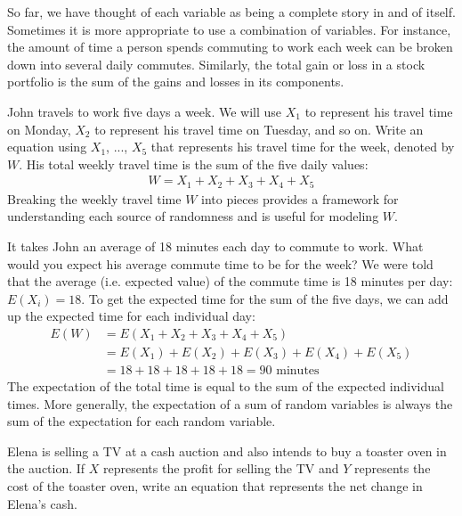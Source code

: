 So far, we have thought of each variable as being a complete story in and of itself. Sometimes it is more appropriate to use a combination of variables. For instance, the amount of time a person spends commuting to work each week can be broken down into several daily commutes. Similarly, the total gain or loss in a stock portfolio is the sum of the gains and losses in its components.

\begin{examplewrap}
\begin{nexample}{John travels to work five days a week. We will use $X_1$ to represent his travel time on Monday, $X_2$ to represent his travel time on Tuesday, and so on. Write an equation using $X_1$, ..., $X_5$ that represents his travel time for the week, denoted by $W$.}
His total weekly travel time is the sum of the five daily values:
\begin{align*}
W = X_1 + X_2 + X_3 + X_4 + X_5
\end{align*}
Breaking the weekly travel time $W$ into pieces provides a framework for understanding each source of randomness and is useful for modeling $W$.
\end{nexample}
\end{examplewrap}

\begin{examplewrap}
\begin{nexample}{It takes John an average of 18 minutes each day to commute to work. What would you expect his average commute time to be for the week?}
We were told that the average (i.e. expected value) of the commute time is 18 minutes per day: $E(X_i) = 18$. To get the expected time for the sum of the five days, we can add up the expected time for each individual day:
\begin{align*}
E(W) &= E(X_1 + X_2 + X_3 + X_4 + X_5) \\
	&= E(X_1) + E(X_2) + E(X_3) + E(X_4) + E(X_5) \\
	&= 18 + 18 + 18 + 18 + 18 = 90\text{ minutes}
\end{align*}
The expectation of the total time is equal to the sum of the expected individual times. More generally, the expectation of a sum of random variables is always the sum of the expectation for each random variable.
\end{nexample}
\end{examplewrap}

\begin{exercisewrap}
\begin{nexercise}
\label{elenaIsSellingATVAndBuyingAToasterOvenAtAnAuction}%
Elena is selling a TV at a cash auction and also intends to buy a toaster oven in the auction. If $X$ represents the profit for selling the TV and $Y$ represents the cost of the toaster oven, write an equation that represents the net change in Elena's cash.\footnotemark
\end{nexercise}
\end{exercisewrap}

